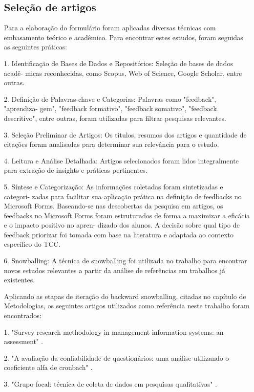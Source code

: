 \subsection{Seleção de artigos}

Para a elaboração do formulário foram aplicadas diversas técnicas com embasamento teórico e acadêmico. Para encontrar estes estudos, foram seguidas as seguintes práticas:

1. Identificação de Bases de Dados e Repositórios: Seleção de bases de dados acadê-
micas reconhecidas, como Scopus, Web of Science, Google Scholar, entre outras.

2. Definição de Palavras-chave e Categorias: Palavras como "feedback", "aprendiza-
gem", "feedback formativo", "feedback somativo", "feedback descritivo", entre outras, foram
utilizadas para filtrar pesquisas relevantes.

3. Seleção Preliminar de Artigos: Os títulos, resumos dos artigos e quantidade de
citações foram analisadas para determinar sua relevância para o estudo.

4. Leitura e Análise Detalhada: Artigos selecionados foram lidos integralmente para
extração de insights e práticas pertinentes.

5. Síntese e Categorização: As informações coletadas foram sintetizadas e categori-
zadas para facilitar sua aplicação prática na definição de feedbacks no Microsoft Forms.
Baseando-se nas descobertas da pesquisa em artigos, os feedbacks no Microsoft
Forms foram estruturados de forma a maximizar a eficácia e o impacto positivo no apren-
dizado dos alunos. A decisão sobre qual tipo de feedback priorizar foi tomada com base
na literatura e adaptada ao contexto específico do TCC.

6. Snowballing:  A técnica de snowballing foi utilizada no trabalho para encontrar novos estudos relevantes a partir da análise de referências em trabalhos já existentes.

Aplicando as etapas de iteração do backward snowballing, citadas no capítulo de Metodologias, os seguintes artigos utilizados como referência neste trabalho foram encontrados:

1. "Survey research methodology in management information systems: an assessment" \cite{pinsonneault1993survey}.

2. "A avaliação da confiabilidade de questionários: uma análise utilizando o coeficiente alfa de cronbach" \cite{freitas2005avaliaccao}.

3. "Grupo focal: técnica de coleta de dados em pesquisas qualitativas" \cite{dias2000grupo}.

